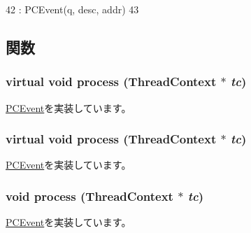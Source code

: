 \begin{DoxyCode}
42         : PCEvent(q, desc, addr)
43     {}
\end{DoxyCode}


\subsection{関数}
\hypertarget{classIdleStartEvent_a7f662d4151352761d86b966fcd5d41f6}{
\subsubsection[{process}]{\setlength{\rightskip}{0pt plus 5cm}virtual void process ({\bf ThreadContext} $\ast$ {\em tc})}}
\label{classIdleStartEvent_a7f662d4151352761d86b966fcd5d41f6}


\hyperlink{classPCEvent_af6ff225900b7b98c08880da7225b38f0}{PCEvent}を実装しています。\hypertarget{classIdleStartEvent_a7f662d4151352761d86b966fcd5d41f6}{
\subsubsection[{process}]{\setlength{\rightskip}{0pt plus 5cm}virtual void process ({\bf ThreadContext} $\ast$ {\em tc})}}
\label{classIdleStartEvent_a7f662d4151352761d86b966fcd5d41f6}


\hyperlink{classPCEvent_af6ff225900b7b98c08880da7225b38f0}{PCEvent}を実装しています。\hypertarget{classIdleStartEvent_ad66a9d5ec7cfe597b848a17c0df5cc28}{
\subsubsection[{process}]{\setlength{\rightskip}{0pt plus 5cm}void process ({\bf ThreadContext} $\ast$ {\em tc})}}
\label{classIdleStartEvent_ad66a9d5ec7cfe597b848a17c0df5cc28}


\hyperlink{classPCEvent_af6ff225900b7b98c08880da7225b38f0}{PCEvent}を実装しています。


